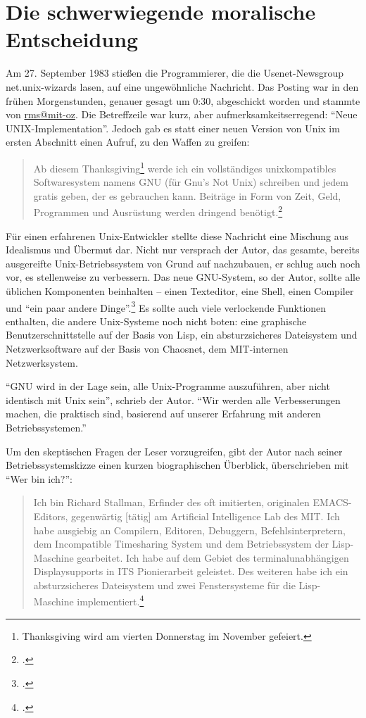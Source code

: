 \chapter{Die schwerwiegende moralische Entscheidung}

Am 27. September 1983 stießen die Programmierer, die die Usenet-Newsgroup net.unix-wizards lasen, auf eine ungewöhnliche Nachricht. Das Posting war in den frühen Morgenstunden, genauer gesagt um 0:30, abgeschickt worden und stammte von \url{rms@mit-oz}. Die Betreffzeile war kurz, aber aufmerksamkeitserregend: "`Neue UNIX-Implementation"'. Jedoch gab es statt einer neuen Version von Unix im ersten Abschnitt einen Aufruf, zu den Waffen zu greifen:

\begin{quote}
Ab diesem Thanksgiving\footnote{Thanksgiving wird am vierten Donnerstag im November gefeiert.} werde ich ein vollständiges unixkompatibles Softwaresystem namens GNU (für Gnu's Not Unix) schreiben und jedem gratis geben, der es gebrauchen kann. Beiträge in Form von Zeit, Geld, Programmen und Ausrüstung werden dringend benötigt.\footcite[Vgl.][]{rmsgnuan}
\end{quote}

Für einen erfahrenen Unix-Entwickler stellte diese Nachricht eine Mischung aus Idealismus und Übermut dar. Nicht nur versprach der Autor, das gesamte, bereits ausgereifte Unix-Betriebssystem von Grund auf nachzubauen, er schlug auch noch vor, es stellenweise zu verbessern. Das neue GNU-System, so der Autor, sollte alle üblichen Komponenten beinhalten – einen Texteditor, eine Shell, einen Compiler und "`ein paar andere Dinge"'.\footcite{rmsgnuan} Es sollte auch viele verlockende Funktionen enthalten, die andere Unix-Systeme noch nicht boten: eine graphische Benutzerschnittstelle auf der Basis von Lisp, ein absturzsicheres Dateisystem und Netzwerksoftware auf der Basis von Chaosnet, dem MIT-internen Netzwerksystem.

"`GNU wird in der Lage sein, alle Unix-Programme auszuführen, aber nicht identisch mit Unix sein"', schrieb der Autor. "`Wir werden alle Verbesserungen machen, die praktisch sind, basierend auf unserer Erfahrung mit anderen Betriebssystemen."'

Um den skeptischen Fragen der Leser vorzugreifen, gibt der Autor nach seiner Betriebssystemskizze einen kurzen biographischen Überblick, überschrieben mit "`Wer bin ich?"':

\begin{quote}
Ich bin Richard Stallman, Erfinder des oft imitierten, originalen EMACS-Editors, gegenwärtig [tätig] am Artificial Intelligence Lab des MIT. Ich habe ausgiebig an Compilern, Editoren, Debuggern, Befehlsinterpretern, dem Incompatible Timesharing System und dem Betriebssystem der Lisp-Maschine gearbeitet. Ich habe auf dem Gebiet des terminalunabhängigen Displaysupports in ITS Pionierarbeit geleistet. Des weiteren habe ich ein absturzsicheres Dateisystem und zwei Fenstersysteme für die Lisp-Maschine implementiert.\footcite{rmsgnuan}
\end{quote}


